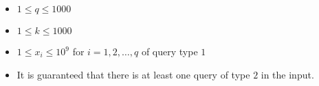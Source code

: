 \begin{itemize}
\tightlist
\item $1 \leq q \leq 1000$
\item $1 \leq k \leq 1000$
\item $1 \leq x_i \leq 10^9$ for $i = 1, 2, \ldots, q$ of query type $1$
\item It is guaranteed that there is at least one query of type $2$ in the input.
\end{itemize}
